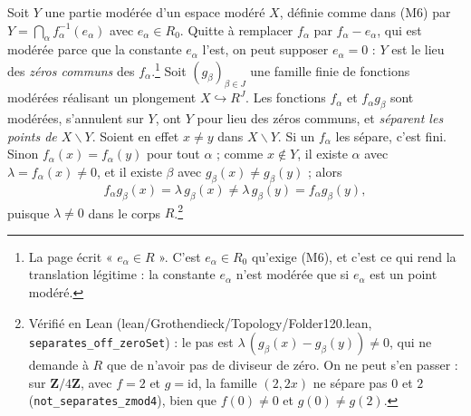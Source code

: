 \documentclass[11pt,a4paper]{article}
\begin{document}
Soit $Y$ une partie modérée d'un espace modéré $X$, définie comme dans (M6)
par $Y = \bigcap_{\alpha} f_\alpha^{-1}(e_\alpha)$ avec $e_\alpha \in R_0$.
Quitte à remplacer $f_\alpha$ par $f_\alpha - e_\alpha$, qui est modérée parce
que la constante $e_\alpha$ l'est, on peut supposer $e_\alpha = 0$ : $Y$ est
le lieu des \emph{zéros communs} des $f_\alpha$.\footnote{La page écrit
« $e_\alpha \in R$ ». C'est $e_\alpha \in R_0$ qu'exige (M6), et c'est ce
qui rend la translation légitime : la constante $e_\alpha$ n'est modérée que si
$e_\alpha$ est un point modéré.} Soit $(g_\beta)_{\beta \in J}$ une famille
finie de fonctions modérées réalisant un plongement $X \hookrightarrow R^J$.
Les fonctions $f_\alpha$ et $f_\alpha g_\beta$ sont modérées, s'annulent sur
$Y$, ont $Y$ pour lieu des zéros communs, et \emph{séparent les points de $X
\smallsetminus Y$}. Soient en effet $x \neq y$ dans $X \smallsetminus Y$. Si
un $f_\alpha$ les sépare, c'est fini. Sinon $f_\alpha(x) = f_\alpha(y)$ pour
tout $\alpha$ ; comme $x \notin Y$, il existe $\alpha$ avec $\lambda =
f_\alpha(x) \neq 0$, et il existe $\beta$ avec $g_\beta(x) \neq g_\beta(y)$ ;
alors
\[ f_\alpha g_\beta(x) = \lambda\, g_\beta(x) \neq \lambda\, g_\beta(y) =
f_\alpha g_\beta(y) , \]
puisque $\lambda \neq 0$ dans le corps $R$.\footnote{Vérifié en Lean
(lean/Grothendieck/Topology/Folder120.lean, \texttt{separates\_off\_zeroSet}) : le pas
est $\lambda\,(g_\beta(x) - g_\beta(y)) \neq 0$, qui ne demande à $R$ que de
n'avoir pas de diviseur de zéro. On ne peut s'en passer : sur
$\mathbf{Z}/4\mathbf{Z}$, avec $f = 2$ et $g = \mathrm{id}$, la famille
$(2, 2x)$ ne sépare pas $0$ et $2$ (\texttt{not\_separates\_zmod4}), bien que
$f(0) \neq 0$ et $g(0) \neq g(2)$.}
\end{document}

